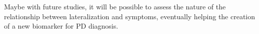 \documentclass[]{article}
\begin{document}
\begin{multicols}{2}
Maybe with future studies, it will be possible to assess the nature of the relationship between lateralization and symptoms, eventually helping the creation of a new biomarker for PD diagnosis. 


\end{multicols}

\printbibliography
\end{document}
